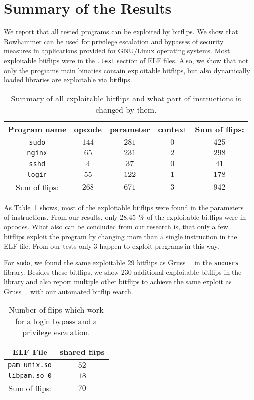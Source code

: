 \section{Summary of the Results}

We report that all tested programs can be exploited by bitflips. We show that
Rowhammer can be used for privilege escalation and bypasses of security measures
in applications provided for GNU/Linux operating systems. Most exploitable
bitflips were in the \texttt{.text} section of ELF files. Also, we show that not
only the program\textquotesingle s main binaries contain exploitable bitflips,
but also dynamically loaded libraries are exploitable via bitflips.

\begin{table}[!htb]
\centering
\begin{tabular}{c|ccc|c}
Program name & opcode & parameter & context & Sum of flips: \\ \hline
\texttt{sudo}  & $144$ & $281$ & $0$ & $425$ \\
\texttt{nginx} & $65$  & $231$ & $2$ & $298$ \\
\texttt{sshd}  & $4$   & $37$  & $0$ & $41$  \\
\texttt{login} & $55$  & $122$ & $1$ & $178$ \\ \hline
Sum of flips:  & $268$ & $671$ & $3$ & $942$
\end{tabular}
\caption{Summary of all exploitable bitflips and what part of instructions is
changed by them.}
\label{tab:summaryflips}
\end{table}

As Table~\ref{tab:summaryflips} shows, most of the exploitable bitflips were
found in the parameters of instructions. From our results, only
\SI{28.45}{\percent} of the exploitable bitflips were in opcodes. What also can
be concluded from our research is, that only a few bitflips exploit the
program by changing more than a single instruction in the ELF file. From
our tests only \num{3} happen to exploit programs in this way.

For \texttt{sudo}, we found the same exploitable \num{29} bitflips as
Gruss~\etal~\cite{flipinthewall} in the \texttt{sudoers} library. Besides these
bitflips, we show \num{230} additional exploitable bitflips in the library and
also report multiple other bitflips to achieve the same exploit as
Gruss~\etal~\cite{flipinthewall} with our automated bitflip search.

\begin{table}
\centering
\begin{tabular}{c|c}
ELF File & shared flips      \\ \hline
\texttt{pam\_unix.so} & $52$ \\
\texttt{libpam.so.0}  & $18$ \\ \hline
Sum of flips:         & $70$
\end{tabular}
\caption{Number of flips which work for a login bypass and a 
privilege escalation.}
\label{tab:loginsudo}
\end{table}

